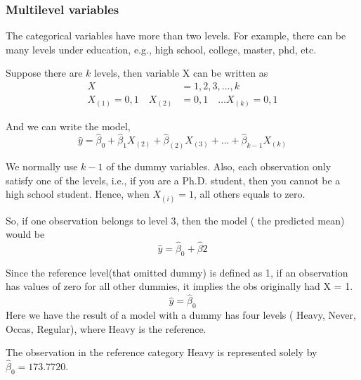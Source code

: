 \documentclass[12pt]{article}
\begin{document}
\subsubsection{Multilevel variables}
The categorical variables have more than two levels.
For example, there can be many levels under education, e.g., 
high school, college, master, phd, etc.

Suppose there are $ k $ levels, then variable X can be written as
\begin{align*}
X &= 1,2,3,...,k\\
X_{(1)} = 0,1 \quad X_{(2)} &= 0,1 \quad ... X_{(k)} = 0,1
\end{align*}

And we can write the model,
\begin{equation*}
 \widehat{y} =  \widehat{\beta}_{0} +  \widehat{\beta}_{1}X_{(2)}
  +  \widehat{\beta}_{(2)}X_{(3)} + ... +  \widehat{\beta}_{k - 1}X_{(k)}
\end{equation*}

We normally use $ k - 1 $ of the dummy variables. Also,
each observation only satisfy one of the levels, i.e., if you are a
Ph.D. student, then you cannot be a high school student.
Hence, when $ X_{(i)} = 1 $, all others equals to zero.

So, if one observation belongs to level 3, then the model (
the predicted mean) would be
\begin{equation*}
 \widehat{y} =  \widehat{\beta}_{0} +  \widehat{\beta}2
\end{equation*}

Since the reference level(that omitted dummy) is defined as 1, 
if an observation has values of zero for all other dummies, it
implies the obs originally had X = 1.
\begin{equation*}
 \widehat{y} =   \widehat{\beta}_{0}
\end{equation*}
Here we have the result of a model with a dummy has four levels (
Heavy, Never, Occas, Regular), where Heavy is the reference.

\begin{figure}[H]
\end{figure}



The observation in the reference category Heavy is represented solely
by $  \widehat{\beta}_{0} = 173.7720 $.
\end{document}
